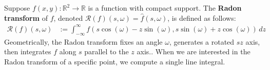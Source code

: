 Suppose $f(x, y): \mathbb{R}^{2} \rightarrow \mathbb{R}$ is a function with compact support. 
The \textbf{Radon transform} of $f$, denoted $\mathcal{R} \left( f \right) (s, \omega) = \widehat{f}(s, \omega)$, is defined as follows:
\begin{align*}
    \mathcal{R}(f) \left( s, \omega \right) & := \int_{-\infty}^{\infty} f \left(s \cos \left( \omega \right) - z \sin \left( \omega \right), s \sin \left( \omega \right) + z \cos \left( \omega \right) \right) \, dz
\end{align*}
Geometrically, the Radon transform fixes an angle $\omega$, generates a rotated $sz$ axis, then integrates $f$ along $s$ parallel to the $z$ axis.\cite{Press:4}.
When we are interested in the Radon transform of a specific point, we compute a single line integral.

